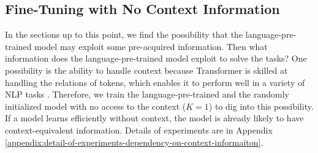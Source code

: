 \subsection{Fine-Tuning with No Context Information}
\label{section:dependency-on-context-informaiton}
In the sections up to this point, we find the possibility that the language-pre-trained model may exploit some pre-acquired information. Then what information does the language-pre-trained model exploit to solve the tasks? One possibility is the ability to handle context because Transformer is skilled at handling the relations of tokens, which enables it to perform well in a variety of 
NLP tasks \cite{tenney2018what}. Therefore, we train the language-pre-trained and the randomly initialized model with no access to the context ($K=1$) to dig into this possibility. If a model learns efficiently without context, the model is already likely to have context-equivalent information. Details of experiments are in Appendix \ref{appendix:detail-of-experiments-dependency-on-context-informaiton}.

